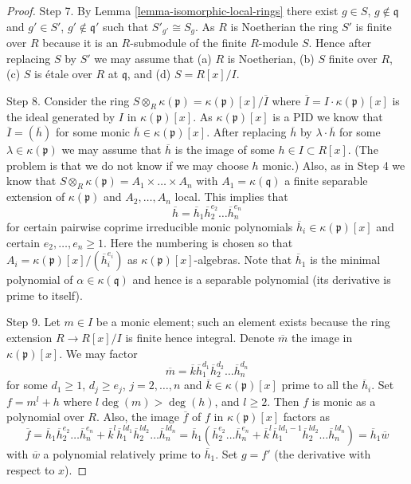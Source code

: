 \begin{proof}
\medskip\noindent
Step 7. By Lemma \ref{lemma-isomorphic-local-rings} there exist
$g \in S$, $g \not \in \mathfrak q$ and $g' \in S'$, $g' \not \in \mathfrak q'$
such that $S'_{g'} \cong S_g$. As $R$ is Noetherian the ring $S'$ is finite
over $R$ because it is an $R$-submodule
of the finite $R$-module $S$. Hence after replacing $S$ by $S'$ we may
assume that (a) $R$ is Noetherian, (b) $S$ finite over $R$, (c)
$S$ is \'etale over $R$ at $\mathfrak q$, and (d) $S = R[x]/I$.

\medskip\noindent
Step 8. Consider the ring
$S \otimes_R \kappa(\mathfrak p) = \kappa(\mathfrak p)[x]/\overline{I}$
where $\overline{I} = I \cdot \kappa(\mathfrak p)[x]$ is the ideal generated
by $I$ in $\kappa(\mathfrak p)[x]$. As $\kappa(\mathfrak p)[x]$ is a PID
we know that $\overline{I} = (\overline{h})$ for some monic
$\overline{h} \in \kappa(\mathfrak p)[x]$. After replacing $\overline{h}$
by $\lambda \cdot \overline{h}$ for some $\lambda \in \kappa(\mathfrak p)$
we may assume that $\overline{h}$ is the image of some $h \in I \subset R[x]$.
(The problem is that we do not know if we may choose $h$ monic.)
Also, as in Step 4 we know that
$S \otimes_R \kappa(\mathfrak p) = A_1 \times \ldots \times A_n$ with
$A_1 = \kappa(\mathfrak q)$ a finite separable extension of
$\kappa(\mathfrak p)$ and $A_2, \ldots, A_n$ local. This implies
that
$$
\overline{h} = \overline{h}_1 \overline{h}_2^{e_2} \ldots \overline{h}_n^{e_n}
$$
for certain pairwise coprime irreducible monic polynomials
$\overline{h}_i \in \kappa(\mathfrak p)[x]$ and certain
$e_2, \ldots, e_n \geq 1$. Here the numbering is chosen so that
$A_i = \kappa(\mathfrak p)[x]/(\overline{h}_i^{e_i})$ as
$\kappa(\mathfrak p)[x]$-algebras. Note that $\overline{h}_1$ is
the minimal polynomial of $\alpha \in \kappa(\mathfrak q)$ and hence
is a separable polynomial (its derivative is prime to itself).

\medskip\noindent
Step 9. Let $m \in I$ be a monic element; such an element exists
because the ring extension $R \to R[x]/I$ is finite hence integral.
Denote $\overline{m}$ the image in $\kappa(\mathfrak p)[x]$.
We may factor
$$
\overline{m} = \overline{k}
\overline{h}_1^{d_1} \overline{h}_2^{d_2} \ldots \overline{h}_n^{d_n}
$$
for some $d_1 \geq 1$, $d_j \geq e_j$, $j = 2, \ldots, n$ and
$\overline{k} \in \kappa(\mathfrak p)[x]$ prime to all the $\overline{h}_i$.
Set $f = m^l + h$ where $l \deg(m) > \deg(h)$, and $l \geq 2$.
Then $f$ is monic as a polynomial over $R$. Also, the image $\overline{f}$
of $f$ in $\kappa(\mathfrak p)[x]$ factors as
$$
\overline{f} =
\overline{h}_1 \overline{h}_2^{e_2} \ldots \overline{h}_n^{e_n}
+
\overline{k}^l \overline{h}_1^{ld_1} \overline{h}_2^{ld_2}
\ldots \overline{h}_n^{ld_n}
=
\overline{h}_1(\overline{h}_2^{e_2} \ldots \overline{h}_n^{e_n}
+
\overline{k}^l
\overline{h}_1^{ld_1 - 1} \overline{h}_2^{ld_2} \ldots \overline{h}_n^{ld_n})
= \overline{h}_1 \overline{w}
$$
with $\overline{w}$ a polynomial relatively prime to $\overline{h}_1$.
Set $g = f'$ (the derivative with respect to $x$).


\end{proof}
